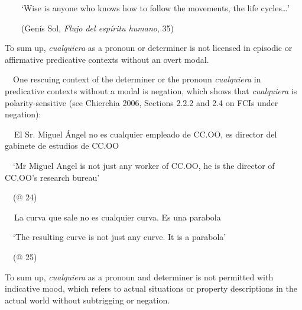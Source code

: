 \begin{styleStandard}
\ \ \ \ ‘Wise is anyone who knows how to follow the movements, the life cycles…’ 
\end{styleStandard}

\begin{styleStandard}
\ \ \ \ (Genís Sol, \textit{Flujo del espíritu humano}, 35)
\end{styleStandard}

\begin{styleStandard}
To sum up, \textit{cualquiera} as a pronoun or determiner is not licensed in episodic or affirmative predicative contexts without an overt modal. 
\end{styleStandard}

\begin{styleStandard}
\ \ One rescuing context of the determiner or the pronoun \textit{cualquiera} in predicative contexts without a modal is negation, which shows that \textit{cualquiera} is polarity-sensitive (see Chierchia 2006, Sections 2.2.2 and 2.4 on FCIs under negation):
\end{styleStandard}

\begin{styleStandard}
\textbf{\ \ }El Sr. Miguel Ángel no es cualquier empleado de CC.OO, es director del gabinete de estudios de CC.OO
\end{styleStandard}

\begin{styleStandard}
\ \ ‘Mr Miguel Angel is not just any worker of CC.OO, he is the director of CC.OO’s research bureau’
\end{styleStandard}

\begin{styleStandard}
\ \ (@ 24)
\end{styleStandard}

\begin{styleStandard}
\textbf{\ \ }La curva que sale no es cualquier curva. Es una parabola
\end{styleStandard}

\begin{styleStandard}
\ \ ‘The resulting curve is not just any curve. It is a parabola’
\end{styleStandard}

\begin{styleStandard}
\ \ (@ 25)
\end{styleStandard}

\begin{styleStandard}
To sum up, \textit{cualquiera} as a pronoun and determiner is not permitted with indicative mood, which refers to actual situations or property descriptions in the actual world without subtrigging or negation.
\end{styleStandard}

